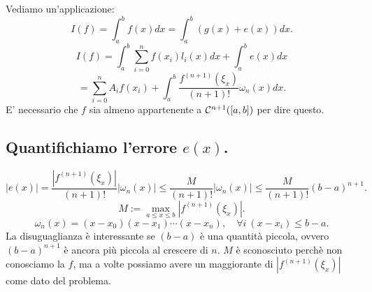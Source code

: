 \begin{exe}Vediamo un'applicazione:
\[I(f) = \int_a^bf(x)dx = \int_a^b\left(g(x)+e(x)\right) dx.\]
\[I(f) = \int_a^b\sum_{i=0}^nf(x_i)l_i(x)dx + \int_a^be(x)dx\]
\[
= \sum_{i=0}^nA_if(x_i) + \int_a^b\frac{f^{(n+1)}(\xi_x)}{(n+1)!}\omega_n(x)dx.\]
E' necessario che $f$ sia almeno appartenente a $\mathcal{C}^{n+1}([a,b])$ per
dire questo.
\end{exe}

\subsection*{Quantifichiamo l'errore $e(x)$.}
\[|e(x)| = \frac{|f^{(n+1)}(\xi_x)|}{(n+1)!}|\omega_n(x)|
\leq \frac{M}{(n+1)!}|\omega_n(x)| \leq \frac{M}{(n+1)!}(b-a)^{n+1}.\]
\[M := \max_{a \leq x \leq b}\left|f^{(n+1)}(\xi_x)\right|.\]
\[
\omega_n(x) = (x-x_0)(x-x_1)\cdots(x-x_n), \quad \forall i\
(x-x_i) \leq b-a.
\]
La disuguaglianza è interessante se $(b-a)$ è una quantità piccola, ovvero
$(b-a)^{n+1}$ è ancora più piccola al crescere di $n$. $M$ è sconosciuto
perchè non conosciamo la $f$, ma a volte possiamo avere un maggiorante di
$|f^{(n+1)}(\xi_x)|$ come dato del problema.


